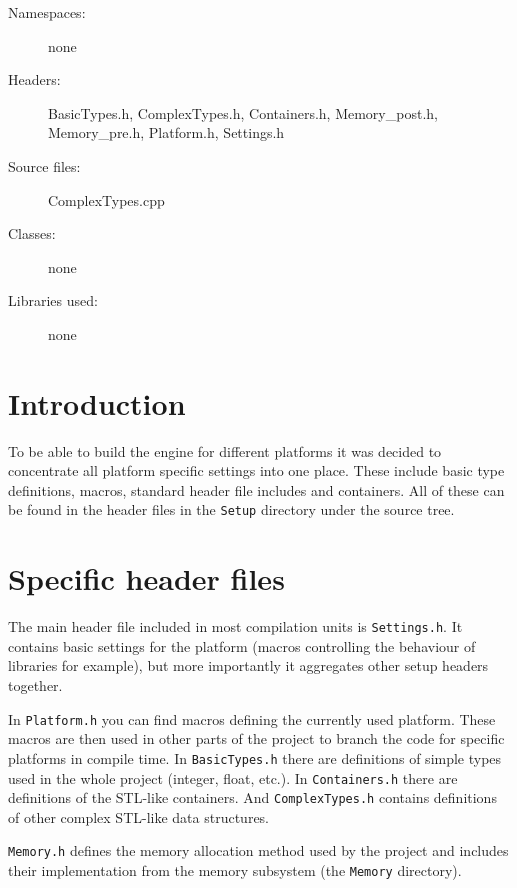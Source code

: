 \begin{description}
  \item[Namespaces:] none
  \item[Headers:] BasicTypes.h, ComplexTypes.h, Containers.h, Memory\_post.h, Me\-mo\-ry\-\_pre.h, Platform.h, Settings.h
  \item[Source files:] ComplexTypes.cpp
  \item[Classes:] none
  \item[Libraries used:] none
\end{description}


\section{Introduction}
To be able to build the engine for different platforms it was decided to concentrate all platform specific settings into one place. These include basic type definitions, macros, standard header file includes and containers. All of these can be found in the header files in the \verb'Setup' directory under the source tree.


\section{Specific header files}
The main header file included in most compilation units is \verb'Settings.h'. It contains basic settings for the platform (macros controlling the behaviour of libraries for example), but more importantly it aggregates other setup headers together.

In \verb'Platform.h' you can find macros defining the currently used platform. These macros are then used in other parts of the project to branch the code for specific platforms in compile time. In \verb'BasicTypes.h' there are definitions of simple types used in the whole project (integer, float, etc.). In \verb'Containers.h' there are definitions of the STL-like containers. And \verb'ComplexTypes.h' contains definitions of other complex STL-like data structures.

\verb'Memory.h' defines the memory allocation method used by the project and includes their implementation from the memory subsystem (the \verb'Memory' directory).


%


